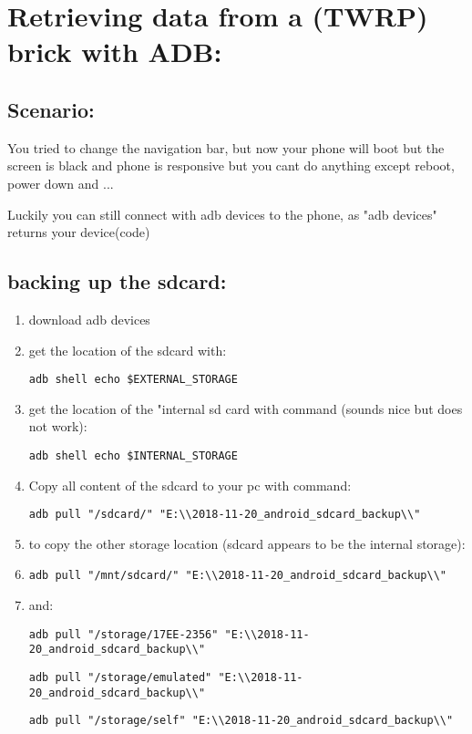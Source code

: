 \section{Retrieving data from a (TWRP) brick with ADB:}\label{sec:ch12}
\subsection{Scenario:}
You tried to change the navigation bar, but now your phone will boot but the screen is black and phone is responsive but you cant do anything except reboot, power down and ...

Luckily you can still connect with adb devices to the phone, as "adb devices" returns your device(code)
\subsection{backing up the sdcard:}
\begin{enumerate}
    \item download adb devices
    \item get the location of the sdcard with:
\begin{verbatim}
adb shell echo $EXTERNAL_STORAGE
\end{verbatim}
    \item get the location of the "internal sd card with command (sounds nice but does not work): 
\begin{verbatim}
adb shell echo $INTERNAL_STORAGE    
\end{verbatim}
    \item Copy all content of the sdcard to your pc with command:
\begin{verbatim}
adb pull "/sdcard/" "E:\\2018-11-20_android_sdcard_backup\\"    
\end{verbatim}    
\item to copy the other storage location (sdcard appears to be the internal storage):
\item 
\begin{verbatim}
adb pull "/mnt/sdcard/" "E:\\2018-11-20_android_sdcard_backup\\"
\end{verbatim}   
\item and:
\begin{verbatim}
adb pull "/storage/17EE-2356" "E:\\2018-11-20_android_sdcard_backup\\"    
\end{verbatim}
\begin{verbatim}
adb pull "/storage/emulated" "E:\\2018-11-20_android_sdcard_backup\\"
\end{verbatim}
\begin{verbatim}
adb pull "/storage/self" "E:\\2018-11-20_android_sdcard_backup\\"
\end{verbatim}
\end{enumerate}

